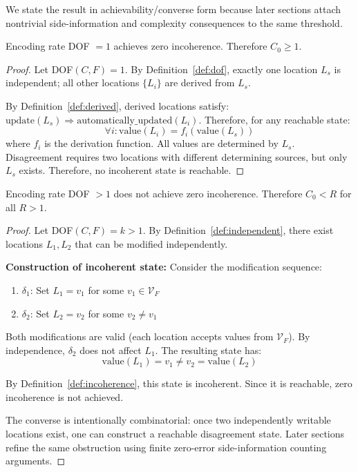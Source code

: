 We state the result in achievability/converse form because later sections attach nontrivial side-information and complexity consequences to the same threshold.

\begin{theorem}[Achievability]\label{thm:capacity-achievability}
Encoding rate DOF $= 1$ achieves zero incoherence. Therefore $C_0 \geq 1$.
\end{theorem}

\begin{proof}
Let DOF$(C, F) = 1$. By Definition~\ref{def:dof}, exactly one location $L_s$ is independent; all other locations $\{L_i\}$ are derived from $L_s$.

By Definition~\ref{def:derived}, derived locations satisfy: $\text{update}(L_s) \Rightarrow \text{automatically\_updated}(L_i)$. Therefore, for any reachable state:
\[
\forall i: \text{value}(L_i) = f_i(\text{value}(L_s))
\]
where $f_i$ is the derivation function. All values are determined by $L_s$. Disagreement requires two locations with different determining sources, but only $L_s$ exists. Therefore, no incoherent state is reachable.
\end{proof}

\begin{theorem}[Converse]\label{thm:capacity-converse}
Encoding rate DOF $> 1$ does not achieve zero incoherence. Therefore $C_0 < R$ for all $R > 1$.
\end{theorem}

\begin{proof}
Let DOF$(C, F) = k > 1$. By Definition~\ref{def:independent}, there exist locations $L_1, L_2$ that can be modified independently.

\textbf{Construction of incoherent state:} Consider the modification sequence:
\begin{enumerate}
\tightlist
\item $\delta_1$: Set $L_1 = v_1$ for some $v_1 \in \mathcal{V}_F$
\item $\delta_2$: Set $L_2 = v_2$ for some $v_2 \neq v_1$
\end{enumerate}

Both modifications are valid (each location accepts values from $\mathcal{V}_F$). By independence, $\delta_2$ does not affect $L_1$. The resulting state has:
\[
\text{value}(L_1) = v_1 \neq v_2 = \text{value}(L_2)
\]

By Definition~\ref{def:incoherence}, this state is incoherent. Since it is reachable, zero incoherence is not achieved.

The converse is intentionally combinatorial: once two independently writable locations exist, one can construct a reachable disagreement state. Later sections refine the same obstruction using finite zero-error side-information counting arguments.
\end{proof}

